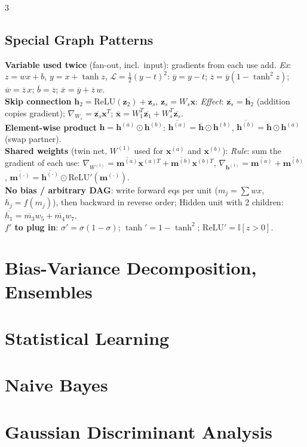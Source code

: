 \documentclass[10pt]{article}
\newcommand{\ind}{\mathbb{I}}
\newcommand{\vx}{\mathbf{x}}
\newcommand{\cL}{\mathcal{L}}
\newcommand{\sub}[1]{\textit{#1}:}  %
\newcommand{\vb}{\mathbf{b}}
\newcommand{\vz}{\mathbf{z}}
\begin{document}
\begin{multicols*}{3}
\subsection{Special Graph Patterns}
\textbf{Variable used twice} (fan-out, incl.\ input): gradients from each use add. \sub{Ex} $z=wx+b$, $y=x+\tanh z$, $\cL=\frac12(y-t)^2$: $\overline y=y-t$; $\overline z=\overline y(1-\tanh^2z)$; $\overline w=\overline z\,x$; $\overline b=\overline z$; $\overline x=\overline y+\overline z\,w$.\\
\textbf{Skip connection} $\mathbf h_2=\text{ReLU}(\vz_2)+\vz_s$, $\vz_s=W_s\vx$: \sub{Effect} $\overline{\vz_s}=\overline{\mathbf h_2}$ (addition copies gradient); $\nabla_{W_s}=\overline{\vz_s}\vx^T$; $\overline{\vx}=W_1^T\overline{\vz_1}+W_s^T\overline{\vz_s}$.\\
\textbf{Element-wise product} $\mathbf h=\mathbf h^{(a)}\odot\mathbf h^{(b)}$: $\overline{\mathbf h^{(a)}}=\overline{\mathbf h}\odot\mathbf h^{(b)}$, $\overline{\mathbf h^{(b)}}=\overline{\mathbf h}\odot\mathbf h^{(a)}$ (swap partner).\\
\textbf{Shared weights} (twin net, $W^{(1)}$ used for $\vx^{(a)}$ and $\vx^{(b)}$): \sub{Rule} sum the gradient of each use: $\nabla_{W^{(1)}}=\overline{\mathbf m^{(a)}}\vx^{(a)T}+\overline{\mathbf m^{(b)}}\vx^{(b)T}$, $\nabla_{\vb^{(1)}}=\overline{\mathbf m^{(a)}}+\overline{\mathbf m^{(b)}}$, $\overline{\mathbf m^{(\cdot)}}=\overline{\mathbf h^{(\cdot)}}\odot\text{ReLU}'(\mathbf m^{(\cdot)})$.\\
\textbf{No bias / arbitrary DAG}: write forward eqs per unit ($m_j=\sum w x$, $h_j=f(m_j)$), then backward in reverse order; Hidden unit with 2 children: $\overline{h_1}=\overline{m_3}w_5+\overline{m_4}w_7$.\\
\textbf{$f'$ to plug in}: $\sigma'=\sigma(1-\sigma)$; $\tanh'=1-\tanh^2$; $\text{ReLU}'=\ind[z>0]$.

\section{Bias-Variance Decomposition, Ensembles}


\section{Statistical Learning}

\section{Naive Bayes}

\section{Gaussian Discriminant Analysis}

\end{multicols*}
\end{document}
